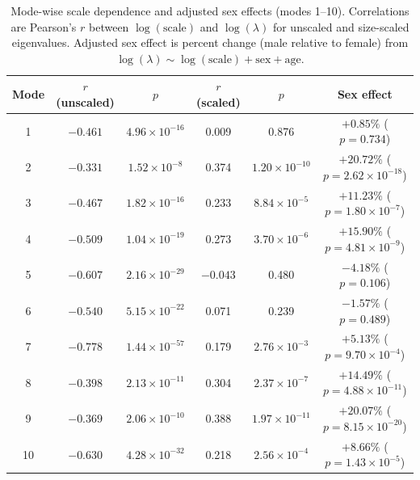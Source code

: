 \documentclass[openacc]{rsproca_new}
\begin{document}
\begin{table}[p]
\centering
\caption{Mode-wise scale dependence and adjusted sex effects (modes 1--10). Correlations are Pearson's $r$ between $\log(\mathrm{scale})$ and $\log(\lambda)$ for unscaled and size-scaled eigenvalues. Adjusted sex effect is percent change (male relative to female) from $\log(\lambda) \sim \log(\mathrm{scale}) + \mathrm{sex} + \mathrm{age}$.}
\label{tab:modes}
\begin{tabular}{cccccc}
\toprule
Mode & $r$ (unscaled) & $p$ & $r$ (scaled) & $p$ & Sex effect \\
\midrule
1 & $-0.461$ & $4.96 \times 10^{-16}$ & 0.009 & 0.876 & $+0.85\%$ ($p=0.734$) \\
2 & $-0.331$ & $1.52 \times 10^{-8}$ & 0.374 & $1.20 \times 10^{-10}$ & $+20.72\%$ ($p=2.62 \times 10^{-18}$) \\
3 & $-0.467$ & $1.82 \times 10^{-16}$ & 0.233 & $8.84 \times 10^{-5}$ & $+11.23\%$ ($p=1.80 \times 10^{-7}$) \\
4 & $-0.509$ & $1.04 \times 10^{-19}$ & 0.273 & $3.70 \times 10^{-6}$ & $+15.90\%$ ($p=4.81 \times 10^{-9}$) \\
5 & $-0.607$ & $2.16 \times 10^{-29}$ & $-0.043$ & 0.480 & $-4.18\%$ ($p=0.106$) \\
6 & $-0.540$ & $5.15 \times 10^{-22}$ & 0.071 & 0.239 & $-1.57\%$ ($p=0.489$) \\
7 & $-0.778$ & $1.44 \times 10^{-57}$ & 0.179 & $2.76 \times 10^{-3}$ & $+5.13\%$ ($p=9.70 \times 10^{-4}$) \\
8 & $-0.398$ & $2.13 \times 10^{-11}$ & 0.304 & $2.37 \times 10^{-7}$ & $+14.49\%$ ($p=4.88 \times 10^{-11}$) \\
9 & $-0.369$ & $2.06 \times 10^{-10}$ & 0.388 & $1.97 \times 10^{-11}$ & $+20.07\%$ ($p=8.15 \times 10^{-20}$) \\
10 & $-0.630$ & $4.28 \times 10^{-32}$ & 0.218 & $2.56 \times 10^{-4}$ & $+8.66\%$ ($p=1.43 \times 10^{-5}$) \\
\bottomrule
\end{tabular}
\end{table}
\end{document}
